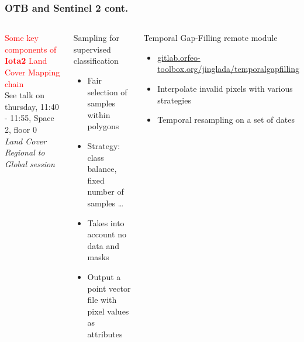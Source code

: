 \documentclass[8pt,aspectratio=169]{beamer}
\begin{document}
      \begin{frame}
        \frametitle{OTB and Sentinel 2 cont.}
        \begin{columns}

          \begin{center}
          \textcolor{red}{Some key components of \textbf{Iota2} Land Cover Mapping chain}\\
          \small{See talk on thursday, 11:40 - 11:55, Space 2, floor 0\\ \emph{Land Cover Regional to Global session}}
          \end{center}

          \begin{block}{Sampling for supervised classification}
            \begin{itemize}
            \item Fair selection of samples within polygons
            \item Strategy: class balance, fixed number of samples \ldots
            \item Takes into account no data and masks
            \item Output a point vector file with pixel values as attributes
            \end{itemize}
        \end{block}
        
        \begin{block}{Temporal Gap-Filling remote module}
          \begin{itemize}
          \item \small{\url{gitlab.orfeo-toolbox.org/jinglada/temporalgapfilling}}
          \item Interpolate invalid pixels with various strategies
          \item Temporal resampling on a set of dates
          \end{itemize}
          
        \end{block}
        

\end{columns}
\end{frame}
\end{document}
